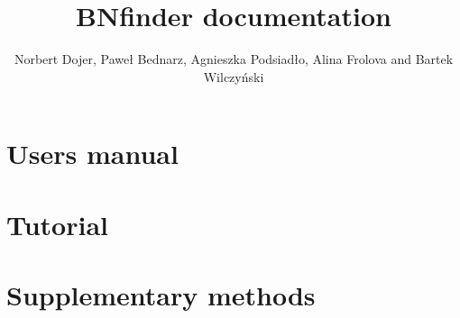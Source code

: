 \documentclass{howto}
\title{ BNfinder documentation}
\author{Norbert Dojer, Paweł Bednarz, Agnieszka Podsiadło, Alina Frolova and Bartek Wilczyński}
\begin{document}
\maketitle
\tableofcontents
\newpage

\section{Users manual}
\label{sec:man}



\section{Tutorial}
\label{sec:tutor}



\section{Supplementary methods}



%

\end{document}
